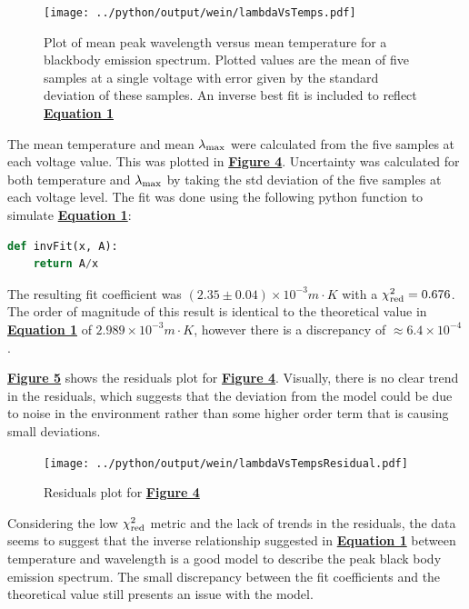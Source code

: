 \documentclass[
	letterpaper
	12pt
]{template}
\newcommand{\bref}[2]{\textbf{\hyperref[#1]{#2}}}
\begin{document}
\begin{figure}\label{fig::expOne}
	\vspace{-15pt}
	\texttt{[image: ../python/output/wein/lambdaVsTemps.pdf]}
	\caption{Plot of mean peak wavelength versus mean temperature for a blackbody emission spectrum. Plotted values are the mean of five samples at a single voltage with error given by the standard deviation of these samples. An inverse best fit is included to reflect \bref{eqn::wien}{Equation 1} }
	\vspace{-50pt}
\end{figure}
The mean temperature and mean $\lambda_{\rm max}$ were calculated from the five samples at each voltage value. This was plotted in \bref{fig::expOne}{Figure 4}. Uncertainty was calculated for both temperature and $\lambda_{\rm max}$ by taking the std deviation of the five samples at each voltage level. The fit was done using the following python function to simulate \bref{eqn::wien}{Equation 1}:
\begin{lstlisting}[label={fnc::invFit},captionpos=b,language=python]
	def invFit(x, A):
    return A/x
\end{lstlisting}
The resulting fit coefficient was $(2.35\pm 0.04)\times10^{-3} \unit{m\cdot K}$ with a $\chi_{\rm red }^2 = 0.676$. The order of magnitude of this result is identical to the theoretical value in \bref{eqn::wien}{Equation 1} of $ 2.989\times 10^{-3}\unit{m\cdot K}$, however there is a discrepancy of $\approx 6.4\times10^{-4}$.\vspace\baselineskip

\bref{fig::expOneRes}{Figure 5} shows the residuals plot for \bref{fig::expOne}{Figure 4}. Visually, there is no clear trend in the residuals, which suggests that the deviation from the model could be due to noise in the environment rather than some higher order term that is causing small deviations. \vspace{\baselineskip}

\begin{figure}\label{fig::expOneRes}
	\vspace{-20pt}
	\texttt{[image: ../python/output/wein/lambdaVsTempsResidual.pdf]}
	\caption{Residuals plot for \bref{fig::expOne}{Figure 4}}
	\vspace{-20pt}
\end{figure}
Considering the low $\chi_{\rm red}^2$ metric and the lack of trends in the residuals, the data seems to suggest that the inverse relationship suggested in \bref{eqn::wien}{Equation 1} between temperature and wavelength is a good model to describe the peak black body emission spectrum. The small discrepancy between the fit coefficients and the theoretical value still presents an issue with the model. \vspace\baselineskip
\end{document}
